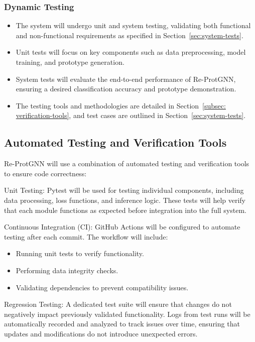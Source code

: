 \documentclass[12pt, titlepage]{article}
\begin{document}
\subsubsection{Dynamic Testing} 
\begin{itemize} 
    \item The system will undergo unit and system testing, validating both functional and non-functional requirements as specified in Section~\ref{sec:system-tests}. 
    \item Unit tests will focus on key components such as data preprocessing, model training, and prototype generation. 
    \item System tests will evaluate the end-to-end performance of Re-ProtGNN, ensuring a desired classification accuracy and prototype demonstration. 
    \item The testing tools and methodologies are detailed in Section~\ref{subsec: verification-tools}, and test cases are outlined in Section~\ref{sec:system-tests}. 
\end{itemize}


\subsection{Automated Testing and Verification Tools}
\label{sec:att}
\label{subsec: verification-tools}
Re-ProtGNN will use a combination of automated testing and verification tools to ensure code correctness:

Unit Testing:
Pytest will be used for testing individual components, including data processing, loss functions, and inference logic. These tests will help verify that each module functions as expected before integration into the full system.

Continuous Integration (CI):
GitHub Actions will be configured to automate testing after each commit. The workflow will include:
\begin{itemize}
    \item Running unit tests to verify functionality.
    \item Performing data integrity checks.
    \item Validating dependencies to prevent compatibility issues.
\end{itemize}

Regression Testing:
A dedicated test suite will ensure that changes do not negatively impact previously validated functionality. Logs from test runs will be automatically recorded and analyzed to track issues over time, ensuring that updates and modifications do not introduce unexpected errors.
\end{document}
